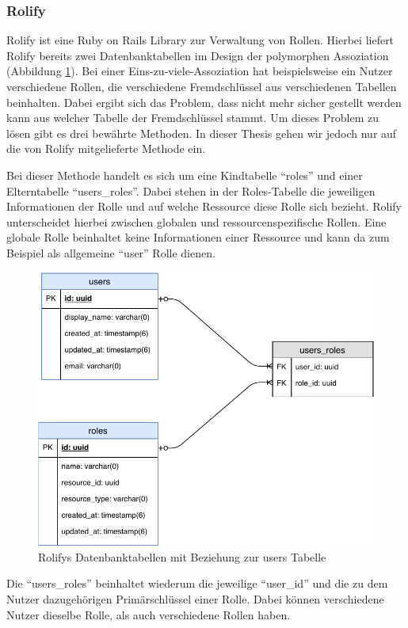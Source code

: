 \subsubsection{Rolify}
\label{sec: rolify}
Rolify ist eine Ruby on Rails Library zur Verwaltung von Rollen. Hierbei liefert Rolify bereits zwei Datenbanktabellen im Design der polymorphen Assoziation (Abbildung \ref{fig:server-polymorph-association}). Bei einer Eins-zu-viele-Assoziation hat beispielsweise ein Nutzer verschiedene Rollen, die verschiedene Fremdschlüssel aus verschiedenen Tabellen beinhalten. Dabei ergibt sich das Problem, dass nicht mehr sicher gestellt werden kann aus welcher Tabelle der Fremdschlüssel stammt. Um dieses Problem zu lösen gibt es drei bewährte Methoden. In dieser Thesis gehen wir jedoch nur auf die von Rolify mitgelieferte Methode ein.

Bei dieser Methode handelt es sich um eine Kindtabelle \enquote{roles} und einer Elterntabelle \enquote{users\_roles}. Dabei stehen in der Roles-Tabelle die jeweiligen Informationen der Rolle und auf welche Ressource diese Rolle sich bezieht. Rolify unterscheidet hierbei zwischen globalen und ressourcenspezifische Rollen. Eine globale Rolle beinhaltet keine Informationen einer Ressource und kann da zum Beispiel als allgemeine \enquote{user} Rolle dienen.

\begin{figure}[h]
	\centering
	\includegraphics[width=.6\textwidth]{graphics/rolify.pdf}
	\caption{Rolifys Datenbanktabellen mit Beziehung zur users Tabelle}
	\label{fig:server-polymorph-association}
\end{figure}

Die \enquote{users\_roles} beinhaltet wiederum die jeweilige \enquote{user\_id} und die zu dem Nutzer dazugehörigen Primärschlüssel einer Rolle. Dabei können verschiedene Nutzer dieselbe Rolle, als auch verschiedene Rollen haben.

